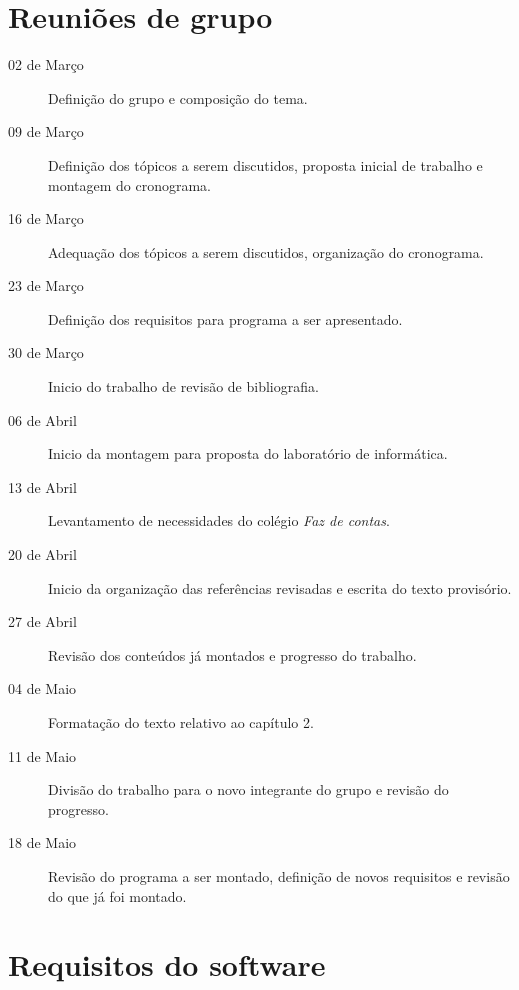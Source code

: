 \appendix

\chapter{Reuniões de grupo}

\begin{description}

    \item[02 de Março] Definição do grupo e composição do tema.

    \item[09 de Março] Definição dos tópicos a serem discutidos, proposta
    inicial de trabalho e montagem do cronograma.

    \item[16 de Março] Adequação dos tópicos a serem discutidos, organização
    do cronograma.

    \item[23 de Março] Definição dos requisitos para programa a ser
    apresentado.

    \item[30 de Março] Inicio do trabalho de revisão de bibliografia.

    \item[06 de Abril] Inicio da montagem para proposta do laboratório de
    informática.

    \item[13 de Abril] Levantamento de necessidades do colégio \emph{Faz de
    contas}.

    \item[20 de Abril] Inicio da organização das referências revisadas e
    escrita do texto provisório.

    \item[27 de Abril] Revisão dos conteúdos já montados e progresso do
    trabalho.

    \item[04 de Maio] Formatação do texto relativo ao capítulo 2.

    \item[11 de Maio] Divisão do trabalho para o novo integrante do grupo e
    revisão do progresso.

    \item[18 de Maio] Revisão do programa a ser montado, definição de novos
    requisitos e revisão do que já foi montado.

\end{description}

\chapter{Requisitos do software}

